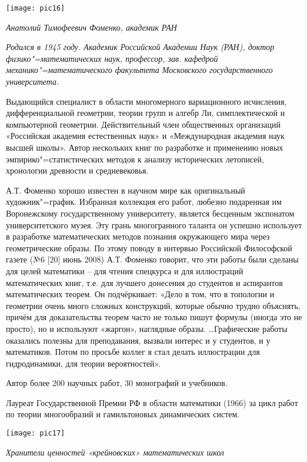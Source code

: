 \begin{center}

\texttt{[image: pic16]}


{\it Анатолий Тимофеевич Фоменко, академик РАН}
\end{center}

{\it Родился в 1945 году. Академик Российской Академии Наук (РАН), доктор физико"=математических наук, профессор, зав. кафедрой механико"=математического факультета Московского государственного университета.

Выдающийся специалист в области многомерного вариационного исчисления, дифференциальной геометрии, теории групп и алгебр Ли, симплектической и компьютерной геометрии. Действительный член общественных организаций «Российская академия естественных наук» и «Международная академия наук высшей школы». Автор нескольких книг по разработке и применению новых эмпирико"=статистических методов к анализу исторических летописей, хронологии древности и средневековья.

А.Т. Фоменко хорошо известен в научном мире как оригинальный художник"=график. Избранная коллекция его работ, любезно подаренная им Воронежскому государственному университету, является бесценным экспонатом университетского музея. Эту грань многогранного таланта он успешно использует в разработке математических методов познания окружающего мира через геометрические образы. По этому поводу в интервью Российской Философской газете (№6 [20] июнь 2008) А.Т. Фоменко говорит, что эти работы были сделаны для целей математики – для чтения спецкурса и для иллюстраций математических книг, т.е. для лучшего донесения до студентов и аспирантов математических теорем.  Он подчёркивает: «Дело в том, что в топологии и геометрии очень много сложных конструкций, которые обычно трудно объяснять, причём для доказательства теорем часто не только пишут формулы (иногда это не просто), но и используют «жаргон», наглядные образы. …Графические работы оказались полезны для преподавания, вызвали интерес и у студентов, и у математиков. Потом по просьбе коллег я стал делать иллюстрации для гидродинамики, для теории вероятностей».

Автор более 200 научных работ, 30 монографий и учебников.

Лауреат Государственной Премии РФ в области математики (1966) за цикл работ по теории многообразий и гамильтоновых динамических систем.}


\begin{center}

\texttt{[image: pic17]}


{\it Хранители ценностей
«крейновских» математических школ
}
\end{center}

